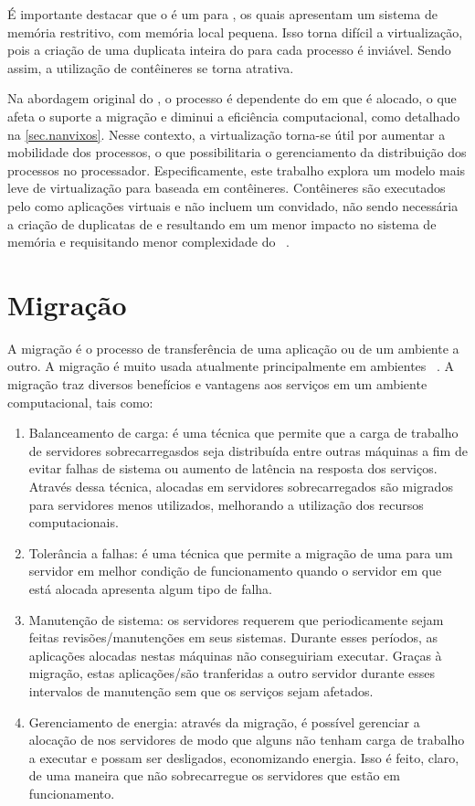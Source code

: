 É importante destacar que o \nanvix é um \so para \lws, os quais apresentam um sistema de memória restritivo, com memória local pequena. Isso torna difícil a virtualização, pois a criação de uma duplicata inteira do \so para cada processo é inviável. Sendo assim, a utilização de contêineres se torna atrativa. 

Na abordagem original do \nanvix, o processo é dependente do \cluster em que é alocado, o que afeta o suporte a migração e diminui a eficiência computacional, como detalhado na \autoref{sec.nanvixos}. Nesse contexto, a virtualização torna-se útil por aumentar a mobilidade dos processos, o que possibilitaria o gerenciamento da distribuição dos processos no processador. Especificamente, este trabalho explora um modelo mais leve de virtualização para \lws baseada em contêineres. Contêineres são executados pelo \os como aplicações virtuais e não incluem um \os convidado, não sendo necessária a criação de duplicatas de \sos e resultando em um menor impacto no sistema de memória e requisitando menor complexidade do \hardware~\cite{thalheim2018cntr, sharma2016containers, zhang2018comparative}.


\section{Migração}
A migração é o processo de transferência de uma aplicação ou \vm de um ambiente a outro. A migração é muito usada atualmente principalmente em ambientes \cloud~\cite{imran2022live}. A migração traz diversos benefícios e vantagens aos serviços em um ambiente computacional, tais como:
\begin{enumerate}[label=(\roman*)]
    \item Balanceamento de carga: é uma técnica que permite que a carga de trabalho de servidores sobrecarregasdos seja distribuída entre outras máquinas a fim de evitar falhas de sistema ou aumento de latência na resposta dos serviços. Através dessa técnica, \vms alocadas em servidores sobrecarregados são migrados para servidores menos utilizados, melhorando a utilização dos recursos computacionais.
    \item Tolerância a falhas: é uma técnica que permite a migração de uma \vm para um servidor em melhor condição de funcionamento quando o servidor em que está alocada apresenta algum tipo de falha.
    \item Manutenção de sistema: os servidores requerem que periodicamente sejam feitas revisões/manutenções em seus sistemas. Durante esses períodos, as aplicações alocadas nestas máquinas não conseguiriam executar. Graças à migração, estas aplicações/\vms são tranferidas a outro servidor durante esses intervalos de manutenção sem que os serviços sejam afetados.
    \item Gerenciamento de energia: através da migração, é possível gerenciar a alocação de \vms nos servidores de modo que alguns não tenham carga de trabalho a executar e possam ser desligados, economizando energia. Isso é feito, claro, de uma maneira que não sobrecarregue os servidores que estão em funcionamento.
\end{enumerate}

